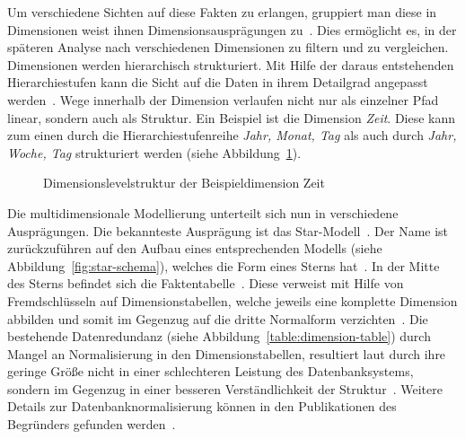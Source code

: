 \documentclass[
  language=german, %
  type=bachelor,%
  ngerman
]{isthesis}
\begin{document}
\begin{content}
  Um verschiedene Sichten auf diese Fakten zu erlangen, gruppiert man diese in
  Dimensionen \bzw{} weist ihnen Dimensionsausprägungen zu~\cite[][S.
  66]{Kemper2010}. Dies ermöglicht es, in der späteren Analyse nach
  verschiedenen Dimensionen zu filtern und zu vergleichen. Dimensionen werden
  hierarchisch strukturiert. Mit Hilfe der daraus entstehenden Hierarchiestufen
  kann die Sicht auf die Daten in ihrem Detailgrad angepasst werden~\cite[][S.
  66]{Kemper2010}. Wege innerhalb der Dimension verlaufen nicht nur als
  einzelner Pfad linear, sondern auch als Struktur. Ein Beispiel ist die
  Dimension \textit{Zeit}.  Diese kann zum einen durch die
  Hierarchiestufenreihe \textit{Jahr, Monat, Tag} als auch durch \textit{Jahr,
  Woche, Tag} strukturiert werden (siehe
  Abbildung~\ref{hierarchie-level-struktur}).

  \begin{figure}
    \resizebox{100pt}{!}{}
    \caption{Dimensionslevelstruktur der Beispieldimension Zeit}\label{hierarchie-level-struktur}
  \end{figure}

	Die multidimensionale Modellierung unterteilt sich nun in verschiedene
	Ausprägungen.  Die bekannteste Ausprägung ist das Star-Modell~\cite[][S.
	2]{phipps2002automating}. Der Name ist zurückzuführen auf den Aufbau eines
	entsprechenden Modells (siehe Abbildung~\ref{fig:star-schema}), welches die
	Form eines Sterns hat~\cite[][S.  44]{Kimball2013}. In der Mitte des Sterns
	befindet sich die Faktentabelle~\cite[][S. 67]{Kemper2010}. Diese verweist
	mit Hilfe von Fremdschlüsseln auf Dimensionstabellen, welche jeweils eine
	komplette Dimension abbilden und somit im Gegenzug auf die dritte Normalform
	verzichten~\cite[][S. 67 f.]{Kemper2010}. Die bestehende Datenredundanz
	(siehe Abbildung~\ref{table:dimension-table}) durch Mangel an Normalisierung
	in den Dimensionstabellen, resultiert laut \textsc{\citeauthor{Kimball2013}}
	durch ihre geringe Größe nicht in einer schlechteren Leistung des
	Datenbanksystems, sondern im Gegenzug in einer besseren Verständlichkeit der
	Struktur~\cite[][S. 15]{Kimball2013}. Weitere Details zur
	Datenbanknormalisierung können in den Publikationen des
	Begründers 
	\textsc{\citeauthor{codd1970relational}} gefunden
	werden~\citeyearpar{codd1970relational,codd1972further}.


\end{content}
\end{document}
